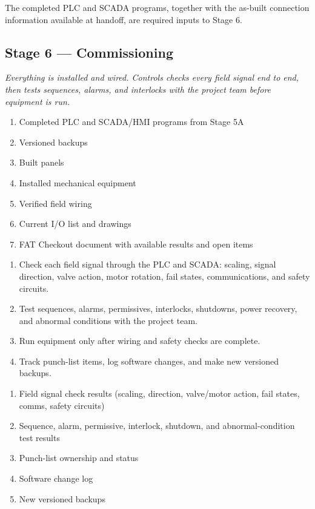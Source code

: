 The completed PLC and SCADA programs, together with the as-built connection information available at handoff, are required inputs to Stage 6.

\subsection{Stage 6 --- Commissioning}
\textit{Everything is installed and wired. Controls checks every field signal end to end, then tests sequences, alarms, and interlocks with the project team before equipment is run.}

\begin{enumerate}[itemsep=1pt]
  \item Completed PLC and SCADA/HMI programs from Stage 5A
  \item Versioned backups
  \item Built panels
  \item Installed mechanical equipment
  \item Verified field wiring
  \item Current I/O list and drawings
  \item FAT Checkout document with available results and open items
\end{enumerate}

\begin{enumerate}[itemsep=1pt]
  \item Check each field signal through the PLC and SCADA: scaling, signal direction, valve action, motor rotation, fail states, communications, and safety circuits.
  \item Test sequences, alarms, permissives, interlocks, shutdowns, power recovery, and abnormal conditions with the project team.
  \item Run equipment only after wiring and safety checks are complete.
  \item Track punch-list items, log software changes, and make new versioned backups.
\end{enumerate}

\begin{enumerate}[itemsep=1pt]
  \item Field signal check results (scaling, direction, valve/motor action, fail states, comms, safety circuits)
  \item Sequence, alarm, permissive, interlock, shutdown, and abnormal-condition test results
  \item Punch-list ownership and status
  \item Software change log
  \item New versioned backups
\end{enumerate}

